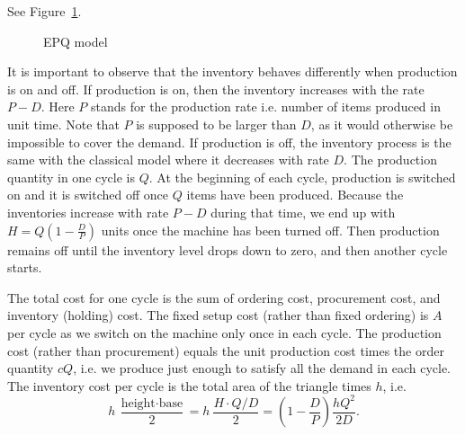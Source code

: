 \begin{solution}

See Figure~\ref{fig:EPQ}.

\begin{figure}[htbp]
\centering
\small
{}
\caption{EPQ model}
\label{fig:EPQ}
\end{figure}


It is important to observe that the inventory behaves differently when production is on and off. If production is on, then the inventory increases with the rate $P-D$. Here $P$ stands for the production rate i.e. number of items produced in unit time. Note that $P$ is supposed to be larger than $D$, as it would otherwise be impossible to cover the demand. If production is off, the inventory process is the same with the classical model where it decreases with rate $D$. The production quantity in one cycle is $Q$. At the beginning of each cycle, production is switched on and it is switched off once $Q$ items have been produced. Because the inventories increase with rate $P-D$ during that time, we end up with $H=Q(1-\frac{D}{P})$ units once the machine has been turned off. Then production remains off until the inventory level drops down to zero, and then another cycle starts.

The total cost for one cycle is the sum of ordering cost, procurement cost, and inventory (holding) cost. The fixed setup cost (rather than fixed ordering) is $A$ per cycle as we switch on the machine only once in each cycle. The production cost (rather than procurement) equals the unit production cost times the order quantity $cQ$, i.e. we produce just enough to satisfy all the demand in each cycle. The inventory cost per cycle is the total area of the triangle times $h$, i.e. 
\begin{equation*}
h~\frac{\text{height}\cdot\text{base}}{2} = h~\frac{H \cdot Q/D }{2} = \left(1-\frac{D}{P}\right) \frac{h Q^2}{2D}.
\end{equation*}


\end{solution}
